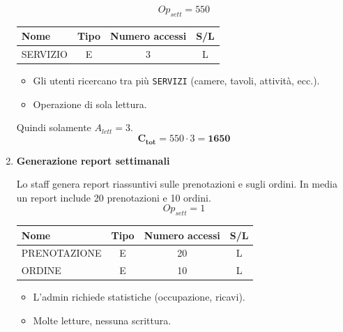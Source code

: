 \documentclass[a4paper,12pt]{report}
\begin{document}
\begin{enumerate}
    $$
    Op_{sett} = 550
    $$

    \begin{table}[H]
    \centering
    \small
    \renewcommand{\arraystretch}{1.15}
    \begin{tabularx}{0.8\textwidth}{|X|c|c|c|}
        \hline
        \rowcolor{gray!20}
        \textbf{Nome} & \textbf{Tipo} & \textbf{Numero accessi} & \textbf{S/L} \\
        \hline
        SERVIZIO & E & 3 & L \\
        \hline
    \end{tabularx}
    \end{table}

    \begin{itemize}
      \item Gli utenti ricercano tra più \texttt{SERVIZI} (camere, tavoli, attività, ecc.).
      \item Operazione di sola lettura.
    \end{itemize}

    Quindi solamente $A_{lett}=3$. \\

    
    $$\mathbf{C_{tot}} = 550 \cdot 3 = \mathbf{1650}$$
    
	\item {\large \textbf{Generazione report settimanali}} \label{op16}
    
    Lo staff genera report riassuntivi sulle prenotazioni e sugli ordini.
    In media un report include 20 prenotazioni e 10 ordini.
    $$
    Op_{sett} = 1
    $$

    \begin{table}[H]
    \centering
    \small
    \renewcommand{\arraystretch}{1.15}
    \begin{tabularx}{0.8\textwidth}{|X|c|c|c|}
        \hline
        \rowcolor{gray!20}
        \textbf{Nome} & \textbf{Tipo} & \textbf{Numero accessi} & \textbf{S/L} \\
        \hline
        PRENOTAZIONE & E & 20 & L \\
        ORDINE & E & 10 & L \\
        \hline
    \end{tabularx}
    \end{table}

    \begin{itemize}
      \item L’admin richiede statistiche (occupazione, ricavi).
      \item Molte letture, nessuna scrittura.
    \end{itemize}


\end{enumerate}
\end{document}
